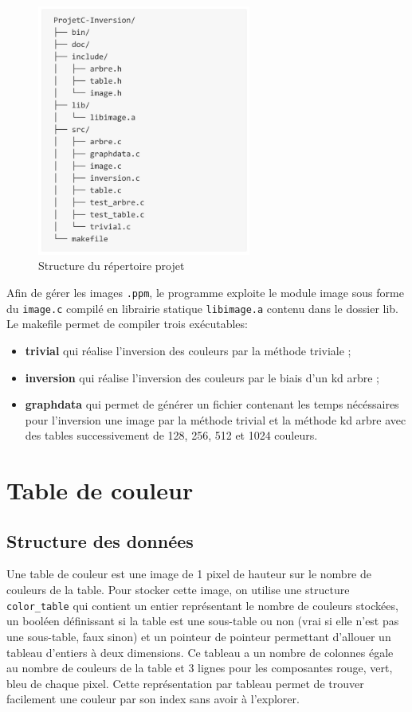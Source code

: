 \documentclass[a4paper,11pt,final]{article}
\begin{document}
\begin{figure}[!ht]
    \centering
    \includegraphics[width=70mm]{./pic/directoryStructure.jpg}
    \caption{Structure du répertoire projet}
\end{figure}

Afin de gérer les images \texttt{.ppm}, le programme exploite le module image sous forme du \texttt{image.c} compilé en librairie statique \texttt{libimage.a} contenu dans le dossier lib. Le makefile permet de compiler trois exécutables:
\begin{itemize}
\item \textbf{trivial} qui réalise l’inversion des couleurs par la méthode triviale ;
\item \textbf{inversion} qui réalise l’inversion des couleurs par le biais d’un kd arbre ;
\item \textbf{graphdata} qui permet de générer un fichier contenant les temps nécéssaires pour l’inversion une image par la méthode trivial et la méthode kd arbre avec des tables successivement de 128, 256, 512 et 1024 couleurs.
\end{itemize}

\section{Table de couleur}

\subsection{Structure des données}

Une table de couleur est une image de 1 pixel de hauteur sur le nombre de couleurs de la table. Pour stocker cette image, on utilise une structure \texttt{color\_table} qui contient un entier représentant le nombre de couleurs stockées, un booléen définissant si la table est une sous-table ou non (vrai si elle n’est pas une sous-table, faux sinon) et un pointeur de pointeur permettant d’allouer un tableau d’entiers à deux dimensions. Ce tableau a un nombre de colonnes égale au nombre de couleurs de la table et 3 lignes pour les composantes rouge, vert, bleu de chaque pixel. Cette représentation par tableau permet de trouver facilement une couleur par son index sans avoir à l’explorer.
\end{document}
